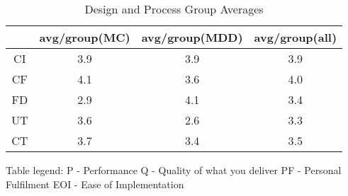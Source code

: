 \documentclass[final_report_innit.tex]{subfiles}
\begin{document}
\begin{table}[h]
\caption{Design and Process Group Averages}
\centering
\begin{tabular}{@{}c|c|c|c|@{}}
\cmidrule(l){2-4}
\multicolumn{1}{l|}{}    & \multicolumn{1}{l|}{avg/group(MC)} & \multicolumn{1}{l|}{avg/group(MDD)} & \multicolumn{1}{l|}{avg/group(all)} \\ \midrule
\multicolumn{1}{|c|}{CI} & 3.9                                & 3.9                                 & 3.9                                 \\ \midrule
\multicolumn{1}{|c|}{CF} & 4.1                                & 3.6                                 & 4.0                                 \\ \midrule
\multicolumn{1}{|c|}{FD} & 2.9                                & 4.1                                 & 3.4                                 \\ \midrule
\multicolumn{1}{|c|}{UT} & 3.6                                & 2.6                                 & 3.3                                 \\ \midrule
\multicolumn{1}{|c|}{CT} & 3.7                                & 3.4                                 & 3.5                                 \\ \bottomrule
\end{tabular}
\end{table}

Table legend:
P - Performance
Q - Quality of what you deliver
PF - Personal Fulfilment
EOI - Ease of Implementation
\end{document}
